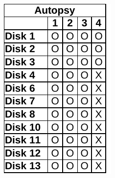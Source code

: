 \begin{paraphrase}
\begin{figure}
    \begin{subfigure}{0.17\linewidth}
        \includegraphics[width=\linewidth]{fig/autopsy_results_ntfs.pdf}
    \end{subfigure}~~
    \begin{subfigure}{0.17\linewidth}

\end{subfigure}
\end{figure}
\end{paraphrase}
